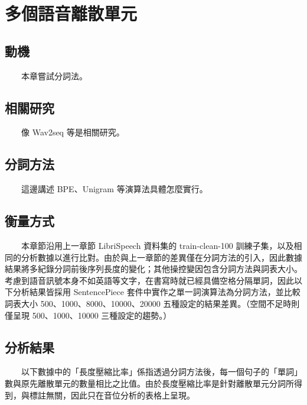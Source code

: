 
\chapter{多個語音離散單元}   

{    
    {     
\section{動機}            　　本章嘗試分詞法。
\section{相關研究} 　　像 Wav2seq \cite{wu_wav2seq_2023}  等是相關研究。
\section{分詞方法} 　　這邊講述 BPE、Unigram 等演算法具體怎麼實行。}
\section{衡量方式}
　　本章節沿用上一章節 LibriSpeech 資料集的 train-clean-100 訓練子集，以及相同的分析數據以進行比對。由於與上一章節的差異僅在分詞方法的引入，因此數據結果將多紀錄分詞前後序列長度的變化；其他操控變因包含分詞方法與詞表大小。考慮到語音訊號本身不如英語等文字，在書寫時就已經具備空格分隔單詞，因此以下分析結果皆採用 SentencePiece 套件中實作之單一詞演算法為分詞方法，並比較詞表大小 500、1000、8000、10000、20000 五種設定的結果差異。（空間不足時則僅呈現 500、1000、10000 三種設定的趨勢。） 
}

\section{分析結果} 
　　以下數據中的「長度壓縮比率」係指透過分詞方法後，每一個句子的「單詞」數與原先離散單元的數量相比之比值。由於長度壓縮比率是針對離散單元分詞所得到，與標註無關，因此只在音位分析的表格上呈現。

